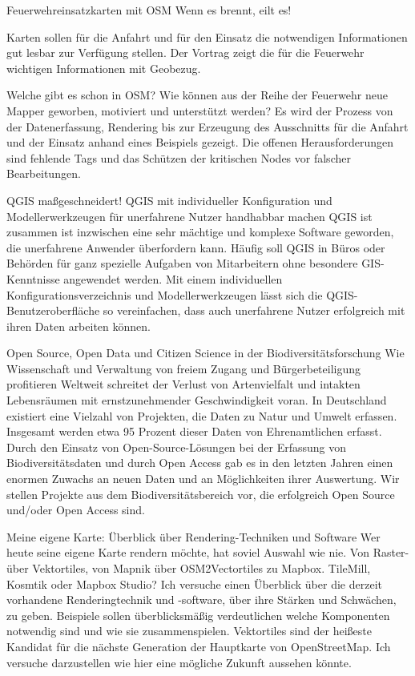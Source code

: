 %
{Feuerwehreinsatzkarten mit OSM}%
{Wenn es brennt, eilt es!}%
{Karten sollen für die
  Anfahrt und für den Einsatz die notwendigen Informationen gut lesbar zur Verfügung stellen.
Der Vortrag zeigt die für die Feuerwehr wichtigen Informationen mit Geobezug.

Welche gibt es schon
in OSM? Wie können aus der Reihe der Feuerwehr neue Mapper geworben, motiviert und unterstützt
werden?  Es wird der Prozess von der Datenerfassung, Rendering bis zur Erzeugung des Ausschnitts für
die
Anfahrt und der Einsatz anhand eines Beispiels gezeigt. Die offenen Herausforderungen sind fehlende
Tags und das Schützen der kritischen Nodes vor falscher Bearbeitungen.}

%
{QGIS maßgeschneidert!}%
{QGIS mit individueller Konfiguration und Modellerwerkzeugen für unerfahrene Nutzer handhabbar machen}%
{QGIS ist zusammen ist inzwischen eine sehr mächtige und komplexe Software geworden, die unerfahrene
  Anwender überfordern kann.  Häufig soll QGIS in Büros oder Behörden für ganz spezielle Aufgaben
  von Mitarbeitern ohne besondere
GIS-Kenntnisse angewendet werden.  Mit einem individuellen Konfigurationsverzeichnis und
Modellerwerkzeugen lässt sich die QGIS-Benutzeroberfläche so vereinfachen, dass auch unerfahrene
Nutzer erfolgreich mit ihren Daten arbeiten können. 
}

%
{Open Source, Open Data und Citizen Science in der Biodiversitätsforschung}%
{Wie Wissenschaft und Verwaltung von freiem Zugang und Bürgerbeteiligung profitieren}%
{Weltweit schreitet der Verlust von Artenvielfalt und intakten Lebensräumen mit ernstzunehmender
Geschwindigkeit voran. In Deutschland existiert eine Vielzahl von Projekten, die Daten zu Natur und
Umwelt erfassen. Insgesamt werden etwa 95 Prozent dieser Daten von Ehrenamtlichen erfasst.  Durch
den Einsatz von Open-Source-Lösungen bei der Erfassung von Biodiversitätsdaten und durch Open Access
gab es in den letzten Jahren einen enormen Zuwachs an neuen Daten und an Möglichkeiten ihrer
Auswertung. Wir stellen Projekte aus dem Biodiversitätsbereich vor, die erfolgreich Open Source
und/oder Open Access sind.}

%
{Meine eigene Karte: Überblick über Rendering-Techniken und Software}%
{}%
{Wer heute seine eigene Karte rendern möchte, hat soviel Auswahl wie nie. Von Raster- über
Vektortiles, von Mapnik über OSM2Vectortiles zu Mapbox. TileMill, Kosmtik oder Mapbox Studio? Ich
versuche einen Überblick über die derzeit vorhandene Renderingtechnik und -software, über ihre
Stärken und Schwächen, zu geben. Beispiele sollen überblicksmäßig verdeutlichen welche Komponenten
notwendig sind und wie sie zusammenspielen. Vektortiles sind der heißeste Kandidat für die nächste
Generation der Hauptkarte von OpenStreetMap. Ich versuche darzustellen wie hier eine mögliche
Zukunft aussehen könnte.}



